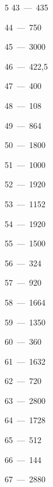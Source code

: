 \documentclass[12pt]{article}
\begin{document}
\begin{multicols}{5}
\mbox{43~--- 435}\par
\mbox{44~--- 750}\par
\mbox{45~--- 3000}\par
\mbox{46~--- 422,5}\par
\mbox{47~--- 400}\par
\mbox{48~--- 108}\par
\mbox{49~--- 864}\par
\mbox{50~--- 1800}\par
\mbox{51~--- 1000}\par
\mbox{52~--- 1920}\par
\mbox{53~--- 1152}\par
\mbox{54~--- 1920}\par
\mbox{55~--- 1500}\par
\mbox{56~--- 324}\par
\mbox{57~--- 920}\par
\mbox{58~--- 1664}\par
\mbox{59~--- 1350}\par
\mbox{60~--- 360}\par
\mbox{61~--- 1632}\par
\mbox{62~--- 720}\par
\mbox{63~--- 2800}\par
\mbox{64~--- 1728}\par
\mbox{65~--- 512}\par
\mbox{66~--- 144}\par
\mbox{67~--- 2880}
\end{multicols}
\end{document}
